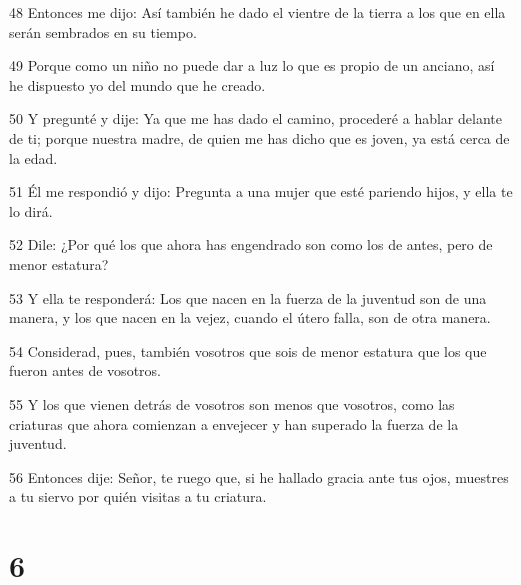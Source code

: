 \par 48 Entonces me dijo: Así también he dado el vientre de la tierra a los que en ella serán sembrados en su tiempo.
\par 49 Porque como un niño no puede dar a luz lo que es propio de un anciano, así he dispuesto yo del mundo que he creado.
\par 50 Y pregunté y dije: Ya que me has dado el camino, procederé a hablar delante de ti; porque nuestra madre, de quien me has dicho que es joven, ya está cerca de la edad.
\par 51 Él me respondió y dijo: Pregunta a una mujer que esté pariendo hijos, y ella te lo dirá.
\par 52 Dile: ¿Por qué los que ahora has engendrado son como los de antes, pero de menor estatura?
\par 53 Y ella te responderá: Los que nacen en la fuerza de la juventud son de una manera, y los que nacen en la vejez, cuando el útero falla, son de otra manera.
\par 54 Considerad, pues, también vosotros que sois de menor estatura que los que fueron antes de vosotros.
\par 55 Y los que vienen detrás de vosotros son menos que vosotros, como las criaturas que ahora comienzan a envejecer y han superado la fuerza de la juventud.
\par 56 Entonces dije: Señor, te ruego que, si he hallado gracia ante tus ojos, muestres a tu siervo por quién visitas a tu criatura.

\chapter{6}

